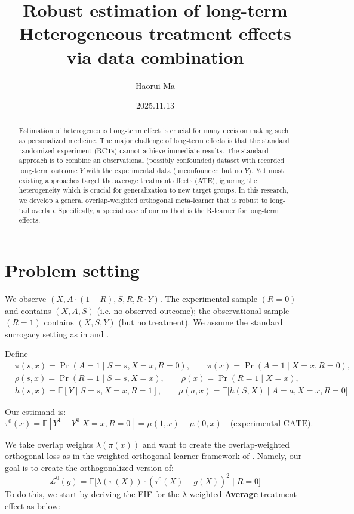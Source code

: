 \documentclass{article} %
\title{Robust estimation of long-term Heterogeneous treatment effects via data combination}
\theoremstyle{plain} %
\theoremstyle{definition} %
\theoremstyle{remark} %
\begin{document}
\maketitle

\begin{abstract}
    Estimation of heterogeneous Long-term effect is crucial for many decision making such as personalized medicine. The major challenge of long-term effects is that the standard randomized experiment (RCTs) cannot achieve immediate results. The standard approach is to combine an observational (possibly confounded) dataset with recorded long-term outcome $Y$ with the experimental data (unconfounded but no $Y$). Yet most existing approaches target the average treatment effects (ATE), ignoring the heterogeneity which is crucial for generalization to new target groups. In this research, we develop a general overlap-weighted orthogonal meta-learner that is robust to long-tail overlap. Specifically, a special case of our method is the R-learner for long-term effects. 
\end{abstract}


\author{Haorui Ma}
\date{2025.11.13}

\section{Problem setting}
We observe $(X,A\cdot(1-R),S,R,R\cdot Y)$. The experimental sample $(R=0)$ and contains $(X,A,S)$ (i.e. no observed outcome); the observational sample $(R=1)$ contains $(X,S,Y)$ (but no treatment). We assume the standard surrogacy setting as in \citet{Chen.2023} and \citet{Athey.2019}.

Define
\begin{align}
&\pi(s,x)=\Pr(A=1\mid S = s,X = x,R = 0),\qquad
\pi(x)=\Pr(A=1\mid X = x,R = 0),\\
&\rho(s,x)=\Pr(R=1\mid S = s,X = x),\qquad
\rho(x)=\Pr(R=1\mid X = x),\\
&h(s,x)=\mathbb E[Y\mid S = s,X = x,R = 1],\qquad
\mu(a,x)=\mathbb E \big[h(S,X)\mid A = a,X = x,R = 0\big]
\end{align}


Our estimand is:
\begin{equation}
    \tau^0(x)=\mathbb{E}[Y^1-Y^0|X=x,R=0]=\mu(1,x)-\mu(0,x)\quad\text{(experimental CATE)}.
\end{equation}

We take overlap weights $\lambda(\pi(x))$ and want to create the overlap-weighted orthogonal loss as in the weighted orthogonal learner framework of \citet{Morzywolek.2025}. Namely, our goal is to create the orthogonalized version of:
\begin{equation}
\label{eq:lambda-mse-L0}
\mathcal{L}^0(g)=\mathbb{E}\bigl[\lambda(\pi(X))\cdot(\tau^0(X)-g(X))^2 \mid R = 0\bigr]
\end{equation}
To do this, we start by deriving the EIF for the $\lambda$-weighted \textbf{Average} treatment effect as below:
\end{document}
